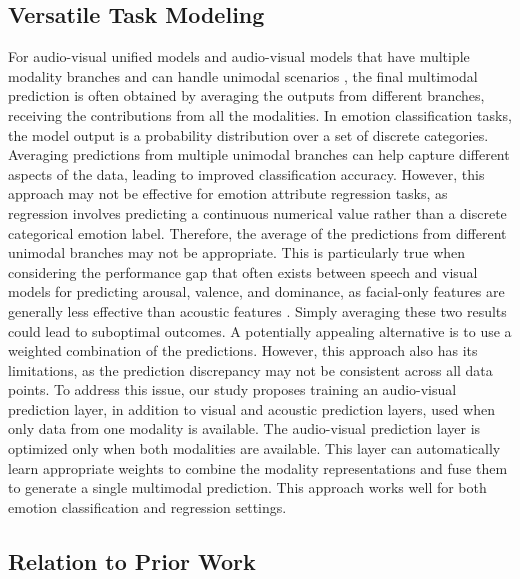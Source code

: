 \documentclass{article}
\begin{document}
\subsection{Versatile Task Modeling}
\label{ssec:Versatile}

For audio-visual unified models \cite{gong_2022} and audio-visual models that have multiple modality branches and can handle unimodal scenarios \cite{Goncalves_2022_3}, the final multimodal prediction is often obtained by averaging the outputs from different branches, receiving the contributions from all the modalities. In emotion classification tasks, the model output is a probability distribution over a set of discrete categories. Averaging predictions from multiple unimodal branches can help capture different aspects of the data, leading to improved classification accuracy. However, this approach may not be effective for emotion attribute regression tasks, as regression involves predicting a continuous numerical value rather than a discrete categorical emotion label. Therefore, the average of the predictions from different unimodal branches may not be appropriate. This is particularly true when considering the performance gap that often exists between speech and visual models for predicting arousal, valence, and dominance, as facial-only features are generally less effective than acoustic features \cite{Parthasarathy_2020_2}. Simply averaging these two results could lead to suboptimal outcomes. A potentially appealing alternative is to use a weighted combination of the predictions. However, this approach also has its limitations, as the prediction discrepancy may not be consistent across all data points. To address this issue, our study proposes training an audio-visual prediction layer, in addition to visual and acoustic prediction layers, used when only data from one modality is available. The audio-visual prediction layer is optimized only when both modalities are available. This layer can automatically learn appropriate weights to combine the modality representations and fuse them to generate a single multimodal prediction. This approach works well for both emotion classification and regression settings.


\subsection{Relation to Prior Work}
\label{ssec:relation}
\end{document}
